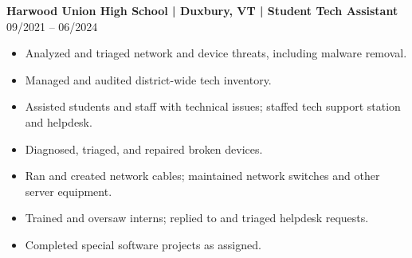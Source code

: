 \noindent
\textbf{Harwood Union High School | Duxbury, VT | Student Tech Assistant} \hfill 09/2021 -- 06/2024
\begin{itemize}
    \item Analyzed and triaged network and device threats, including malware removal.
    \item Managed and audited district-wide tech inventory.
    \item Assisted students and staff with technical issues; staffed tech support station and helpdesk.
    \item Diagnosed, triaged, and repaired broken devices.
    \item Ran and created network cables; maintained network switches and other server equipment.
    \item Trained and oversaw interns; replied to and triaged helpdesk requests.
    \item Completed special software projects as assigned.
\end{itemize}
